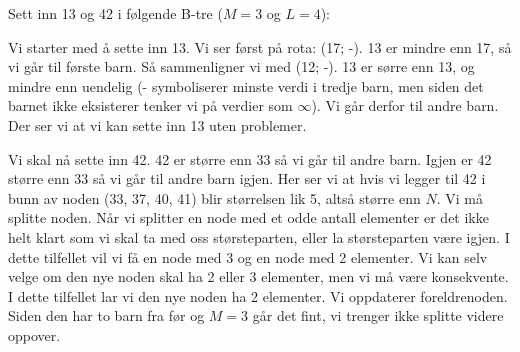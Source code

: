 \begin{example} Sett inn 13 og 42 i følgende B-tre ($ M = 3 $ og $ L = 4 $):
\begin{figure}[H]
\centering
{}
\end{figure}

Vi starter med å sette inn 13. Vi ser først på rota: (17; -). 13 er mindre enn 17, så vi går til første barn. Så sammenligner vi med (12; -). 13 er sørre enn 13, og mindre enn uendelig (- symboliserer minste verdi i tredje barn, men siden det barnet ikke eksisterer tenker vi på verdier som $ \infty $). Vi går derfor til andre barn. Der ser vi at vi kan sette inn 13 uten problemer. 

Vi skal nå sette inn 42. 42 er større enn 33 så vi går til andre barn. Igjen er 42 større enn 33 så vi går til andre barn igjen. Her ser vi at hvis vi legger til 42 i bunn av noden (33, 37, 40, 41) blir størrelsen lik 5, altså større enn $ N $. Vi må splitte noden. Når vi splitter en node med et odde antall elementer er det ikke helt klart som vi skal ta med oss størsteparten, eller la størsteparten være igjen. I dette tilfellet vil vi få en node med 3 og en node med 2 elementer. Vi kan selv velge om den nye noden skal ha 2 eller 3 elementer, men vi må være konsekvente. I dette tilfellet lar vi den nye noden ha 2 elementer. Vi oppdaterer foreldrenoden. Siden den har to barn fra før og $ M=3 $ går det fint, vi trenger ikke splitte videre oppover. 


\end{example}
